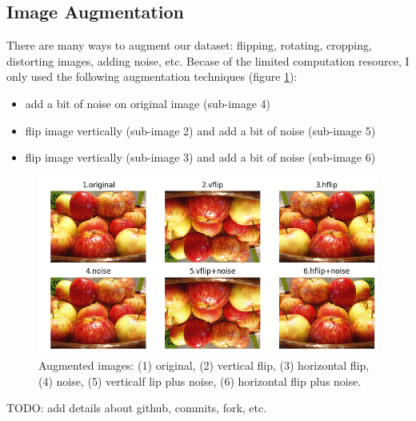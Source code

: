 \subsection{Image Augmentation}
There are many ways to augment our dataset: flipping, rotating, cropping, distorting images, adding noise, etc. Becase of the limited computation resource, I only used the following augmentation techniques (figure \ref{fig:augment1}):
\begin{itemize}
	\item add a bit of noise on original image (sub-image 4)
	\item flip image vertically (sub-image 2) and add a bit of noise (sub-image 5)
	\item flip image vertically (sub-image 3) and add a bit of noise (sub-image 6)
\end{itemize}
\begin{figure}[bh!]
	\centering
	\includegraphics[width=0.8\hsize]{./figures/augment1}
	\caption{Augmented images: (1) original, (2) vertical flip, (3) horizontal flip, (4) noise, (5) verticalf lip plus noise, (6) horizontal flip plus noise.}
	\label{fig:augment1}
\end{figure}


TODO: add details about github, commits, fork, etc.